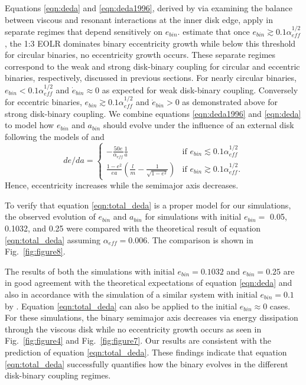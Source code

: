 Equations \ref{eqn:deda} and \ref{eqn:deda1996}, derived by \citet{Arty96b} via examining the balance between viscous and resonant interactions at the inner 
disk edge, apply in separate regimes that depend sensitively on $e_{bin}$.  \citet{Arty96b} estimate that once $e_{bin} \gtrsim 0.1 \alpha_{eff}^{1/2}$, the 1:3 
EOLR dominates binary eccentricity growth while below this threshold for circular binaries, no eccentricity growth occurs.  These separate regimes correspond 
to the weak and strong disk-binary coupling for circular and eccentric binaries, respectively, discussed in previous sections.  For nearly circular binaries, 
$e_{bin} < 0.1 \alpha_{eff}^{1/2}$ and $\dot{e}_{bin} \approx 0$ as expected for weak disk-binary coupling.  Conversely for eccentric binaries, $e_{bin} \gtrsim 
0.1 \alpha_{eff}^{1/2}$ and $\dot{e}_{bin} > 0$ as demonstrated above for strong disk-binary coupling.  We combine equations \ref{eqn:deda1996} and 
\ref{eqn:deda} to model how $e_{bin}$ and $a_{bin}$ should evolve under the influence of an external disk following the models of \citet{Arty96b,Arty2000} and 
\citet{Dermine2013}
\begin{equation}
\label{eqn:total_deda}
de/da=
\begin{cases}
-\frac{50e}{\alpha_{eff}}\frac{1}{a} & \text{if } e_{bin} \lesssim 0.1 \alpha_{eff}^{1/2}\\
\frac{1 - e^2}{ea} \left(\frac{l}{m} - \frac{1}{\sqrt{1 - e^2}}\right) & \text{if } e_{bin} \gtrsim 0.1 \alpha_{eff}^{1/2}.
\end{cases}
\end{equation}
Hence, eccentricity increases while the semimajor axis decreases.

To verify that equation \ref{eqn:total_deda} is a proper model for our simulations, the observed evolution of $e_{bin}$ and $a_{bin}$ for simulations with initial $e_{bin} =$ 0.05, 0.1032, and 0.25 were compared with the theoretical result of equation \ref{eqn:total_deda} assuming $\alpha_{eff} = 0.006$.  The comparison is shown in Fig.~\ref{fig:figure8}.

The results of both the simulations with initial $e_{bin} = 0.1032$ and $e_{bin} = 0.25$ are in good agreement with the theoretical expectations of equation \ref{eqn:deda} and also in accordance with the simulation of a similar system with initial $e_{bin} = 0.1$ by \citet{Artymowicz1991}.  Equation \ref{eqn:total_deda} can also be applied to the initial $e_{bin} \approx 0$ cases.  For these simulations, the binary semimajor axis decreases via energy dissipation through the viscous disk while no eccentricity growth occurs as seen in Fig.~\ref{fig:figure4} and Fig.~\ref{fig:figure7}.  Our results are consistent with the prediction of equation \ref{eqn:total_deda}.  These findings indicate that equation \ref{eqn:total_deda} successfully quantifies how the binary evolves in the different disk-binary coupling regimes.

